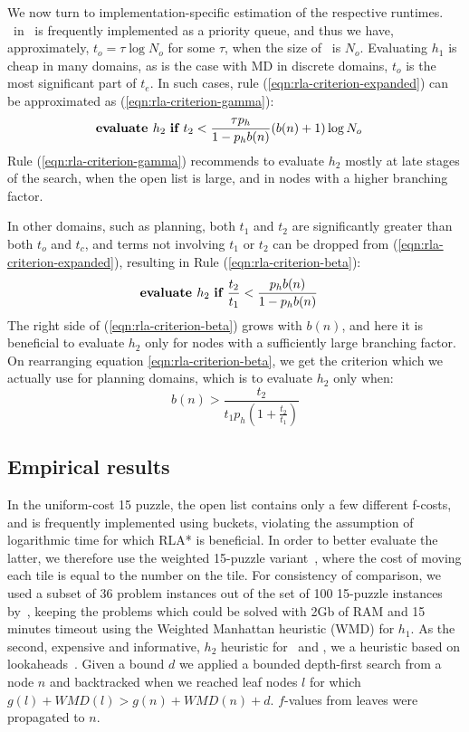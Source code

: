 We now turn to implementation-specific estimation of the respective runtimes.
\OPEN~in \astar~is frequently implemented as a priority queue, and thus we have, approximately,
$t_o=\tau \log N_o$ for some $\tau$, when the size of \OPEN~is $N_o$.
Evaluating $h_1$ is cheap in many domains, as is the
case with MD in discrete domains, $t_o$ is the most significant part of
$t_{e}$. In such cases,
rule (\ref{eqn:rla-criterion-expanded}) can be approximated as (\ref{eqn:rla-criterion-gamma}):
\begin{align}
  &\mbox{\bf evaluate }h_2\mbox{ \bf if } t_2 < \frac {\tau p_h} {1-p_hb(n)} (b(n)+1)\log N_o
\label{eqn:rla-criterion-gamma}
\end{align}
Rule (\ref{eqn:rla-criterion-gamma})
recommends to evaluate $h_2$ mostly at late stages of the search,
when the open list is large, and in nodes with a higher branching factor.

In other domains, such as planning, both $t_1$ and $t_2$ are
significantly greater than both $t_o$ and $t_c$, and terms
not involving $t_1$ or $t_2$ can be dropped from
(\ref{eqn:rla-criterion-expanded}), resulting in Rule (\ref{eqn:rla-criterion-beta}):
\begin{align}
  &\mbox{\bf evaluate }h_2\mbox{ \bf if } \frac{t_2}{t_1} < \frac {p_hb(n)} {1-p_hb(n)}
\label{eqn:rla-criterion-beta}
\end{align}
The right side of (\ref{eqn:rla-criterion-beta}) grows with $b(n)$, and here it is beneficial to evaluate $h_2$
only for nodes with a sufficiently large branching factor. On rearranging equation \ref{eqn:rla-criterion-beta},
we get the criterion which we actually use for planning domains,
which is to evaluate $h_2$ only when:
\begin{equation}
b(n) > \frac{t_2}{t_1 p_h \left(1 + \frac{t_2}{t_1}\right)}
\label{eqn:rla-planning-rule}
\end{equation}

\subsection{Empirical results}

In the uniform-cost 15 puzzle, the open list contains only a few different
f-costs, and is frequently implemented using buckets, violating the
assumption of logarithmic time for which RLA* is beneficial. In order
to better evaluate the latter, we therefore use the weighted 15-puzzle
variant~\cite{thayer:bss}, where the cost of moving each tile is equal
to the number on the tile.  For consistency of comparison, we used a
subset of 36 problem instances out of the set of 100 15-puzzle instances
by~\cite{BFID85}, keeping the problems which could be solved with 2Gb
of RAM and 15 minutes timeout using the Weighted Manhattan heuristic
(WMD) for $h_1$. As the second, expensive and informative, $h_2$
heuristic for \lazyastar~and \rationallazyastar, we a heuristic based on
lookaheads~\cite{DBLP:conf/aaai/SternKFH10}. Given a bound $d$ we applied
a bounded depth-first search from a node $n$ and backtracked when we
reached leaf nodes $l$ for which $g(l)+WMD(l)> g(n)+WMD(n)+d$. $f$-values
from leaves were propagated to $n$.

